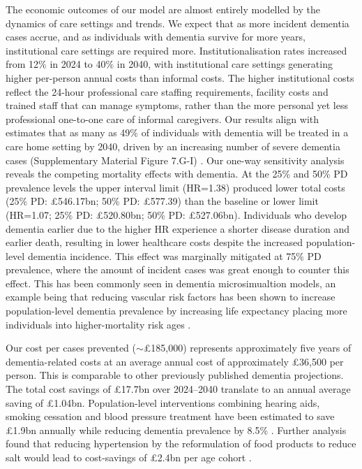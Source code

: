 \documentclass[11pt,a4paper]{article}
\begin{document}
The economic outcomes of our model are almost entirely modelled by the dynamics of care settings and trends. We expect that as more incident dementia cases accrue, and as individuals with dementia survive for more years, institutional care settings are required more. Institutionalisation rates increased from 12\% in 2024 to 40\% in 2040, with institutional care settings generating higher per-person annual costs than informal costs. The higher institutional costs reflect the 24-hour professional care staffing requirements, facility costs and trained staff that can manage symptoms, rather than the more personal yet less professional one-to-one care of informal caregivers. Our results align with estimates that as many as 49\% of individuals with dementia will be treated in a care home setting by 2040, driven by an increasing number of severe dementia cases (Supplementary Material Figure 7.G-I) \cite{ref17}. Our one-way sensitivity analysis reveals the competing mortality effects with dementia. At the 25\% and 50\% PD prevalence levels the upper interval limit (HR=1.38) produced lower total costs (25\% PD: £546.17bn; 50\% PD: £577.39) than the baseline or lower limit (HR=1.07; 25\% PD: £520.80bn; 50\% PD: £527.06bn). Individuals who develop dementia earlier due to the higher HR experience a shorter disease duration and earlier death, resulting in lower healthcare costs despite the increased population-level dementia incidence. This effect was marginally mitigated at 75\% PD prevalence, where the amount of incident cases was great enough to counter this effect. This has been commonly seen in dementia microsimualtion models, an example being that reducing vascular risk factors has been shown to increase population-level dementia prevalence by increasing life expectancy placing more individuals into higher-mortality risk ages \cite{ref44}.

Our cost per cases prevented ($\sim$\pounds185,000) represents approximately five years of dementia-related costs at an average annual cost of approximately \pounds36,500 per person. This is comparable to other previously published dementia projections. The total cost savings of \pounds17.7bn over 2024--2040 translate to an annual average saving of \pounds1.04bn. Population-level interventions combining hearing aids, smoking cessation and blood pressure treatment have been estimated to save \pounds1.9bn annually while reducing dementia prevalence by 8.5\% \cite{ref45}. Further analysis found that reducing hypertension by the reformulation of food products to reduce salt would lead to cost-savings of \pounds2.4bn per age cohort \cite{ref37}.
\end{document}
